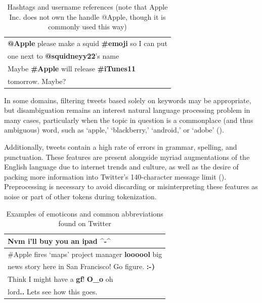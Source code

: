 \documentclass[letterpaper]{article}
\begin{document}
\begin{table}[ht]
\centering
\begin{tabular}{|l|}
	\hline
\textbf{@Apple} please make a squid \textbf{\#emoji} so I can put \\
one next to \textbf{@squidneyy22}'s name\\ \hline
Maybe \textbf{\#Apple} will release \textbf{\#iTunes11} \\
tomorrow. Maybe? \\ \hline
\end{tabular}
\caption{Hashtags and username references (note that Apple Inc. does not own the handle @Apple, though it is commonly used this way)}
\label{tab:hashtag_username}
\end{table}

In some domains, filtering tweets based solely on keywords may be appropriate, but disambiguation remains an interest natural language processing problem in many cases, particularly when the topic in question is a commonplace (and thus ambiguous) word, such as `apple,' `blackberry,' `android,' or `adobe' (\citeauthor{journals/ijcsa/YervaMA12}). 

Additionally, tweets contain a high rate of errors in grammar, spelling, and punctuation. These features are present alongside myriad augmentations of the English language due to internet trends and culture, as well as the desire of packing more information into Twitter's 140-character message limit (\citeauthor{Laboreiro:2010:TMM:1871840.1871853}). Preprocessing is necessary to avoid discarding or misinterpreting these features as noise or part of other tokens during tokenization.

\begin{table}[ht]
\centering
\begin{tabular}{|l|}
	\hline
\textbf{Nvm} i'll buy you an ipad \textbf{\^{}-\^{}} \\ \hline
\#Apple fires `maps' project manager \textbf{loooool} big \\
 news story here in San Francisco! Go figure. \textbf{:-)} \\ \hline
Think I might have a \textbf{gf}! \textbf{O\_o} oh \\
lord\textbf{..} Lets see how this goes. \\ \hline
\end{tabular}
\caption{Examples of emoticons and common abbreviations found on Twitter}
\label{tab:emoticons}
\end{table}
\end{document}
